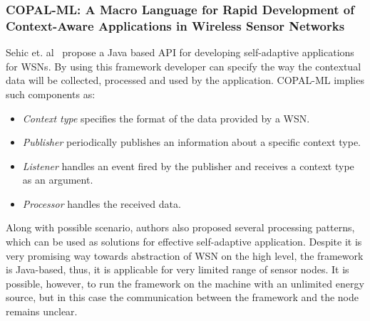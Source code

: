 \subsubsection*{COPAL-ML: A Macro Language for Rapid Development of Context-Aware
Applications in Wireless Sensor Networks}

Sehic et. al~\cite{sehic11} propose a Java based API for developing self-adaptive
applications for WSNs. By using this framework developer can specify the way the
contextual data will be collected, processed and used by the application.
COPAL-ML implies such components as:

\begin{itemize}
\item \emph{Context type} specifies the format of the data provided by a WSN.
\item \emph{Publisher} periodically publishes an information about a specific
context type.
\item \emph{Listener} handles an event fired by the publisher and receives a
context type as an argument.
\item \emph{Processor} handles the received data.
\end{itemize}

Along with possible scenario, authors also proposed several processing patterns,
which can be used as solutions for effective self-adaptive application. Despite it
is very promising way towards abstraction of WSN on the high level, the
framework is Java-based, thus, it is applicable for very limited range of sensor
nodes. It is possible, however, to run the framework on the machine with an
unlimited energy source, but in this case the communication between the
framework and the node remains unclear.

